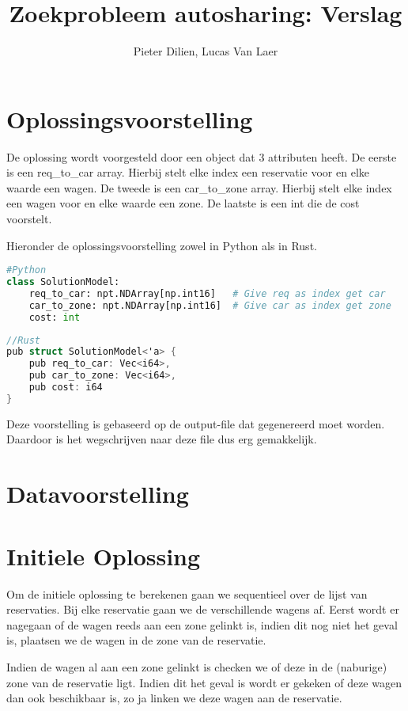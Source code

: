 \documentclass[a4paper, 12pt, one column]{article}
\title{Zoekprobleem autosharing: Verslag}
\author{Pieter Dilien, Lucas Van Laer}
\begin{document}
\maketitle

\section{Oplossingsvoorstelling}
De oplossing wordt voorgesteld door een object dat 3 attributen heeft. De eerste is een req\_to\_car array. Hierbij stelt elke index een reservatie voor en elke waarde een wagen. De tweede is een car\_to\_zone array. Hierbij stelt elke index een wagen voor en elke waarde een zone. De laatste is een int die de cost voorstelt.

Hieronder de oplossingsvoorstelling zowel in Python als in Rust.
\begin{lstlisting}[language=Python]
#Python
class SolutionModel:
    req_to_car: npt.NDArray[np.int16]   # Give req as index get car
    car_to_zone: npt.NDArray[np.int16]  # Give car as index get zone
    cost: int
\end{lstlisting}

\begin{lstlisting}[language=C]
//Rust
pub struct SolutionModel<'a> {
    pub req_to_car: Vec<i64>,
    pub car_to_zone: Vec<i64>,
    pub cost: i64
}
\end{lstlisting}

Deze voorstelling is gebaseerd op de output-file dat gegenereerd moet worden. Daardoor is het wegschrijven naar deze file dus erg gemakkelijk.

\section{Datavoorstelling}


\section{Initiele Oplossing}
Om de initiele oplossing te berekenen gaan we sequentieel over de lijst van reservaties. Bij elke reservatie gaan we de verschillende wagens af. Eerst wordt er nagegaan of de wagen reeds aan een zone gelinkt is, indien dit nog niet het geval is, plaatsen we de wagen in de zone van de reservatie. 

Indien de wagen al aan een zone gelinkt is checken we of deze in de (naburige) zone van de reservatie ligt. Indien dit het geval is wordt er gekeken of deze wagen dan ook beschikbaar is, zo ja linken we deze wagen aan de reservatie.
\end{document}
